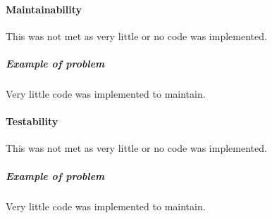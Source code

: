 
\paragraph{Maintainability}
	This was not met as very little or no code was implemented.
	\subparagraph{Example of problem}
		Very little code was implemented to maintain.
	
\paragraph{Testability}
	This was not met as very little or no code was implemented.
	\subparagraph{Example of problem}
		Very little code was implemented to maintain.
